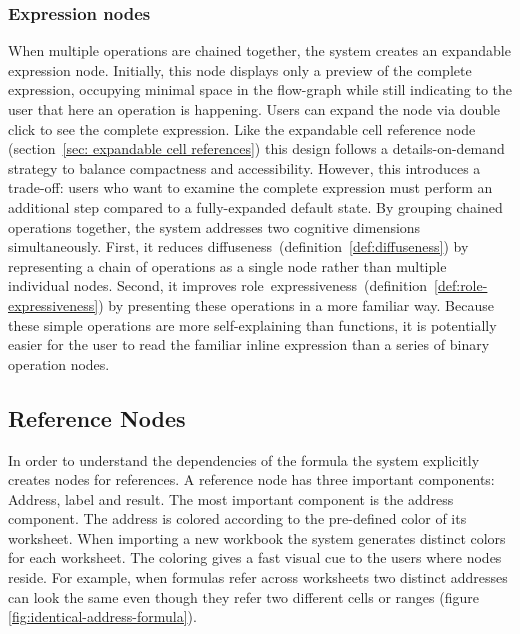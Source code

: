 \subsubsection{Expression nodes}
When multiple operations are chained together, the system creates an expandable expression node. Initially, this node displays only a preview of the complete expression, occupying minimal space in the flow-graph while still indicating to the user that here an operation is happening. Users can expand the node via double click to see the complete expression. 
Like the expandable cell reference node (section~\ref{sec: expandable cell references}) this design follows a details-on-demand strategy to balance compactness and accessibility. However, this introduces a trade-off: users who want to examine the complete expression must perform an additional step compared to a fully-expanded default state.
By grouping chained operations together, the system addresses two cognitive dimensions simultaneously. First, it reduces diffuseness~(definition~\ref{def:diffuseness}) by representing a chain of operations as a single node rather than multiple individual nodes. Second, it improves role~expressiveness~(definition~\ref{def:role-expressiveness}) by presenting these operations in a more familiar way. Because these simple operations are more self-explaining than functions, it is potentially easier for the user to read the familiar inline expression than a series of binary operation nodes. 
\subsection{Reference Nodes}
In order to understand the dependencies of the formula the system explicitly creates nodes for references. A reference node has three important components: Address, label and result. The most important component is the address component. The address is colored according to the pre-defined color of its worksheet. When importing a new workbook the system generates distinct colors for each worksheet. The coloring gives a fast visual cue to the users where nodes reside. For example, when formulas refer across worksheets two distinct addresses can look the same even though they refer two different cells or ranges (figure \ref{fig:identical-address-formula}).

